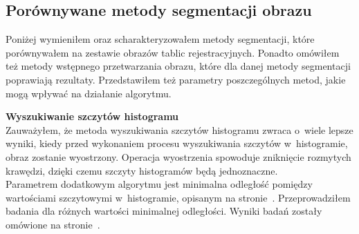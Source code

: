 \subsection{Porównywane metody segmentacji obrazu}
Poniżej wymieniłem oraz scharakteryzowałem metody segmentacji, które porównywałem na zestawie obrazów tablic rejestracyjnych. Ponadto omówiłem też metody wstępnego przetwarzania obrazu, które dla danej metody segmentacji poprawiają rezultaty. Przedstawiłem też parametry poszczególnych metod, jakie mogą wpływać na działanie algorytmu.

\textbf{Wyszukiwanie szczytów histogramu}\\
Zauważyłem, że metoda wyszukiwania szczytów histogramu zwraca o~wiele lepsze wyniki, kiedy przed wykonaniem procesu wyszukiwania szczytów w~histogramie, obraz zostanie wyostrzony. Operacja wyostrzenia spowoduje zniknięcie rozmytych krawędzi, dzięki czemu szczyty histogramów będą jednoznaczne. \\
Parametrem dodatkowym algorytmu jest minimalna odległość pomiędzy wartościami szczytowymi w~histogramie, opisanym na stronie~\pageref{sssec:histogram_peaks}. Przeprowadziłem badania dla różnych wartości minimalnej odległości. Wyniki badań zostały omówione na stronie~\pageref{sssec:histogram_peaks_results}.\\

